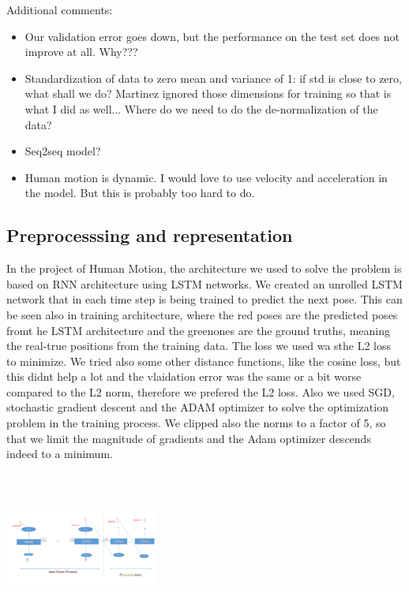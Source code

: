 Additional comments: 
\begin{itemize}
	\item Our validation error goes down, but the performance on the test set does not improve at all. Why???
	\item Standardization of data to zero mean and variance of 1: if std is close to zero, what shall we do? Martinez ignored those dimensions for training so that is what I did as well... Where do we need to do the de-normalization of the data?
	\item Seq2seq model?
	\item Human motion is dynamic. I would love to use velocity and acceleration in the model. But this is probably too hard to do.
\end{itemize}


\subsection{Preprocesssing and representation}

In the project of Human Motion, the architecture we used to solve the problem 
is based on RNN architecture using LSTM networks. We created an unrolled LSTM network that in each time step is being trained 
to predict the next pose. This can be seen also in training architecture, where the red poses are the predicted poses fromt he LSTM architecture
and the greenones are the ground truths, meaning the real-true positions from the training data.
The loss we used wa sthe L2 loss to minimize. We tried also some other distance functions, like the cosine loss, but this didnt help a lot and the 
vlaidation error was the same or a bit worse compared to the L2 norm, therefore we prefered the L2 loss.
Also we used SGD, stochastic gradient descent and the ADAM optimizer to solve the optimization problem in the training process. We clipped also the 
norms to a factor of 5, so that we limit the magnitude of gradients and the Adam optimizer descends indeed to a minimum.

\includegraphics[width=5cm,height=5cm]{Prediciton_achitecture.PNG}


